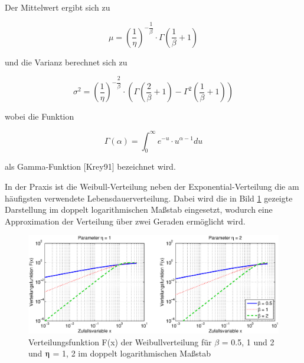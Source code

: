 \clearpage

\noindent Der Mittelwert ergibt sich zu

\begin{equation}\label{eq:fourhundredseightyeight}
\mu =\left(\dfrac{1}{\eta } \right)^{-\dfrac{1}{\beta } } \cdot \Gamma \left(\dfrac{1}{\beta } +1\right)
\end{equation}

\noindent und die Varianz berechnet sich zu

\begin{equation}\label{eq:fourhundredseightynine}
\sigma ^{2} =\left(\dfrac{1}{\eta } \right)^{-\dfrac{2}{\beta } } \cdot \left(\Gamma \left(\dfrac{2}{\beta } +1\right)-\Gamma ^{2} \left(\dfrac{1}{\beta } +1\right)\right)
\end{equation}

\noindent wobei die Funktion 

\begin{equation}\label{eq:fourhundredsninety}
\Gamma \left(\alpha \right)=\int _{0}^{\infty }e^{-u} \cdot u^{\alpha -1} du
\end{equation}

\noindent als Gamma-Funktion [Krey91] bezeichnet wird.\newline

\noindent In der Praxis ist die Weibull-Verteilung neben der Exponential-Verteilung die am h\"{a}ufigsten verwendete Lebensdauerverteilung. Dabei wird die in Bild \ref{fig:Stetig_Weibull3} gezeigte Darstellung im doppelt logarithmischen Ma{\ss}stab eingesetzt, wodurch eine Approximation der Verteilung \"{u}ber zwei Geraden erm\"{o}glicht wird. 

\begin{figure}[H]
  \centerline{\includegraphics[width=1\textwidth]{Kapitel4/Bilder/image28}}
  \caption{Verteilungsfunktion F(x) der Weibullverteilung f\"{u}r $\beta$ = 0.5, 1 und 2 und $\etaup$ = 1, 2 im doppelt logarithmischen Ma{\ss}stab}
  \label{fig:Stetig_Weibull3}
\end{figure}

